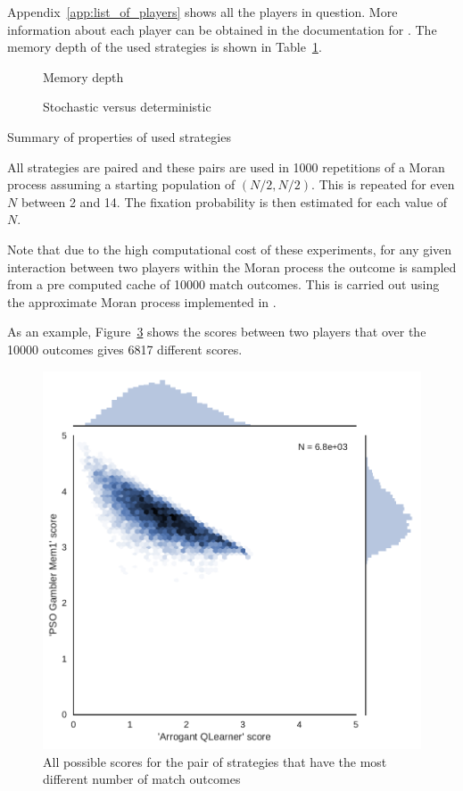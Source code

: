 \documentclass{article}
\begin{document}

Appendix~\ref{app:list_of_players} shows all the players in question. More
information about each player can be obtained in the documentation for
\cite{axelrodproject}. The memory depth of the used strategies is shown in
Table~\ref{tbl:memory_depth_count}.

\begin{table}[!hbtp]
    \centering
        \begin{subfigure}[t]{\textwidth}
            \centering
                
                \caption{Memory depth}
                \label{tbl:memory_depth_count}
        \end{subfigure}
        \vspace{.5cm}

        \begin{subfigure}[t]{\textwidth}
            \centering
                
                \caption{Stochastic versus deterministic}
                \label{tbl:stochastic_count}
        \end{subfigure}
        \caption{Summary of properties of used strategies}
\end{table}

All strategies are paired and these pairs are used in 1000 repetitions of a
Moran process assuming a starting population of \((N/2, N/2)\). This is repeated
for even \(N\) between 2 and 14. The fixation probability is then estimated for
each value of \(N\).

Note that due to the high computational cost of these experiments, for any given
interaction between two players within the Moran process the outcome is sampled
from a pre computed cache of 10000 match outcomes. This is carried out using the
approximate Moran process implemented in \cite{axelrodproject}.

As an example, Figure~\ref{fig:players_with_most_scores} shows the scores
between two players that over the 10000 outcomes gives 6817 different scores.

\begin{figure}[!htbp]
    \centering
    \includegraphics[width=.4\textwidth]{../img/players_with_most_scores.pdf}
    \caption{All possible scores for the pair of strategies that have the most
    different number of match outcomes}
    \label{fig:players_with_most_scores}
\end{figure}
\end{document}
